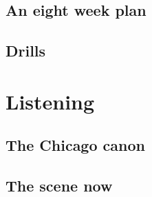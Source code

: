 \documentclass[11pt,letterpaper,oneside]{book}
\begin{document}
\chapter{An eight week plan}


\chapter{Drills}


\part{Listening}
\chapter{The Chicago canon}


\chapter{The scene now}

\end{document}
